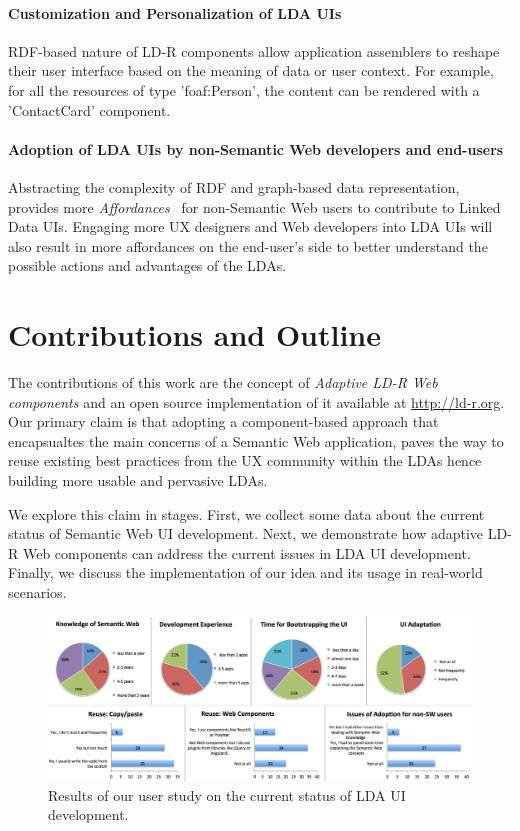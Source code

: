 \documentclass{acm_proc_article-sp}
\begin{document}
\paragraph{Customization and Personalization of LDA UIs} 
RDF-based nature of LD-R components allow application assemblers to reshape their user interface based on the meaning of data or user context.
For example, for all the resources of type 'foaf:Person', the content can be rendered with a 'ContactCard' component.

\paragraph{Adoption of LDA UIs by non-Semantic Web developers and end-users} 
Abstracting the complexity of RDF and graph-based data representation, provides more \emph{Affordances}~\cite{Norman2013} for non-Semantic Web users to contribute to Linked Data UIs.
Engaging more UX designers and Web developers into LDA UIs will also result in more affordances on the end-user's side to better understand the possible actions and advantages of the LDAs.

\section{Contributions and Outline}
The contributions of this work are the concept of \emph{Adaptive LD-R Web components} and an open source implementation of it available at \url{http://ld-r.org}.
Our primary claim is that adopting a component-based approach that encapsualtes the main concerns of a Semantic Web application, paves the way to reuse existing best practices from the UX community within the LDAs hence building more usable and pervasive LDAs.

We explore this claim in stages.
First, we collect some data about the current status of Semantic Web UI development.
Next, we demonstrate how adaptive LD-R Web components can address the current issues in LDA UI development.
Finally, we discuss the implementation of our idea and its usage in real-world scenarios.

\begin{figure}[tb]
  \includegraphics[width=1\linewidth]{images/userstudy.png}
  \caption{Results of our user study on the current status of LDA UI development.}
  \label{fig:userstudy}
\end{figure}
\end{document}
